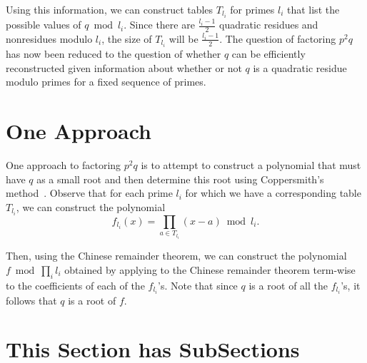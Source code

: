 \documentclass[letterpaper,twocolumn,10pt]{article}
\begin{document}
Using this information, we can construct tables $T_{l_i}$ for primes $l_i$ that list the possible values of $q \bmod l_i$. Since there are $\frac{l_i - 1}{2}$ quadratic residues and nonresidues modulo $l_i$, the size of $T_{l_i}$ will be $\frac{l_i - 1}{2}$. The question of factoring $p^2 q$ has now been reduced to the question of whether $q$ can be efficiently reconstructed given information about whether or not $q$ is a quadratic residue modulo primes for a fixed sequence of primes. 

\section{One Approach}

One approach to factoring $p^2 q$ is to attempt to construct a polynomial that must have $q$ as a small root and then determine this root using Coppersmith's method~\cite{Coppersmith}. Observe that for each prime $l_i$ for which we have a corresponding table $T_{l_i}$, we can construct the polynomial
\[
f_{l_i}(x) = \prod_{a \in T_{l_i}} (x - a) \bmod l_i.
\]

Then, using the Chinese remainder theorem, we can construct the polynomial $f \bmod \prod_i l_i$ obtained by applying to the Chinese remainder theorem term-wise to the coefficients of each of the $f_{l_i}$'s. Note that since $q$ is a root of all the $f_{l_i}$'s, it follows that $q$ is a root of $f$. 

\section{This Section has SubSections}





{\footnotesize 
}


\end{document}
